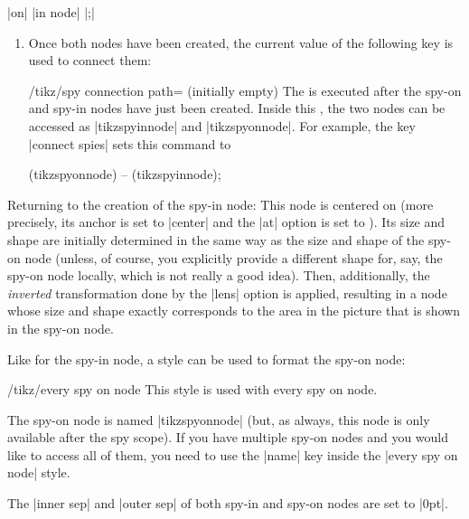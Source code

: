 \begin{command}{\spy {} |on| 
    |in node| |;|}
\begin{enumerate}
  \item Once both nodes have been created, the current value of the
    following key is used to connect them:
    \begin{key}{/tikz/spy connection path= (initially
        \normalfont empty)}
      The  is executed after the spy-on and spy-in nodes
      have just been created. Inside this , the two nodes
      can be accessed as |tikzspyinnode| and  |tikzspyonnode|.
      For example, the key |connect spies| sets this command to
\begin{codeexample}
\draw[thin] (tikzspyonnode) -- (tikzspyinnode);
\end{codeexample}
    \end{key}
  \end{enumerate}
  Returning to the creation of the spy-in node: This node is centered on
   (more precisely, its anchor is set to |center| and
  the |at| option is set to ). Its size and shape are
  initially determined in the same way as the size and shape of the
  spy-on node (unless, of course, you explicitly provide a different
  shape for, say, the spy-on node locally, which is not really a good
  idea). Then, additionally, the \emph{inverted} transformation done
  by the |lens| option is applied, resulting in a node whose size and
  shape exactly corresponds to the area in the picture that is shown
  in the spy-on node.
\begin{codeexample}[]
\end{codeexample}

  Like for the spy-in node, a style can be used to format the spy-on
  node:
  \begin{stylekey}{/tikz/every spy on node}
    This style is used with every spy on node.
  \end{stylekey}
  The spy-on node is named |tikzspyonnode| (but, as always, this node
  is only available after the spy scope). If you have multiple
  spy-on nodes and you would like to access all of them, you need to
  use the |name| key inside the |every spy on node| style.

  The |inner sep| and |outer sep| of both spy-in and spy-on nodes are
  set to |0pt|.
\end{command}




